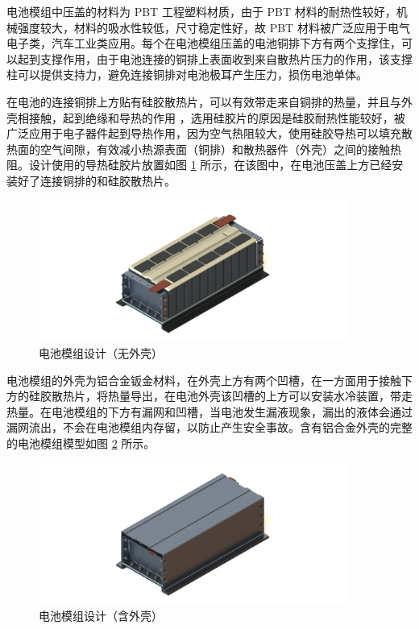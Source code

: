 电池模组中压盖的材料为 PBT 工程塑料材质，由于 PBT 材料的耐热性较好，机械强度较大，材料的吸水性较低，尺寸稳定性好，故 PBT 材料被广泛应用于电气电子类，汽车工业类应用。每个在电池模组压盖的电池铜排下方有两个支撑住，可以起到支撑作用，由于电池连接的铜排上表面收到来自散热片压力的作用，该支撑柱可以提供支持力，避免连接铜排对电池极耳产生压力，损伤电池单体。

在电池的连接铜排上方贴有硅胶散热片，可以有效带走来自铜排的热量，并且与外壳相接触，起到绝缘和导热的作用 \cite{杨凯2014一种锂离子电池温控测试装置}，选用硅胶片的原因是硅胶耐热性能较好，被广泛应用于电子器件起到导热作用，因为空气热阻较大，使用硅胶导热可以填充散热面的空气间隙，有效减小热源表面（铜排）和散热器件（外壳）之间的接触热阻。设计使用的导热硅胶片放置如图 \ref{fig:module} 所示，在该图中，在电池压盖上方已经安装好了连接铜排的和硅胶散热片。

\begin{figure}
	\centering
	\includegraphics[width=0.9\textwidth]{figures/module.jpg}
	\caption{电池模组设计（无外壳）}\label{fig:module}
\end{figure}

电池模组的外壳为铝合金钣金材料，在外壳上方有两个凹槽，在一方面用于接触下方的硅胶散热片，将热量导出，在电池外壳该凹槽的上方可以安装水冷装置，带走热量。在电池模组的下方有漏网和凹槽，当电池发生漏液现象，漏出的液体会通过漏网流出，不会在电池模组内存留，以防止产生安全事故。含有铝合金外壳的完整的电池模组模型如图 \ref{fig:module2} 所示。

\begin{figure}
	\centering
	\includegraphics[width=0.9\textwidth]{figures/module2.jpg}
	\caption{电池模组设计（含外壳）}\label{fig:module2}
\end{figure}

